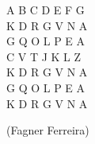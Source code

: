 
\begin{flushright}
    \begin{spacing}{1.0}
    {\selectfont
    A B C D E F G\\
    K D R G V N A\\
    G Q O L P E A\\
    C V T J K L Z\\
    K D R G V N A\\
    G Q O L P E A\\
    K D R G V N A}\end{spacing}
    
    (Fagner Ferreira)
\end{flushright}

